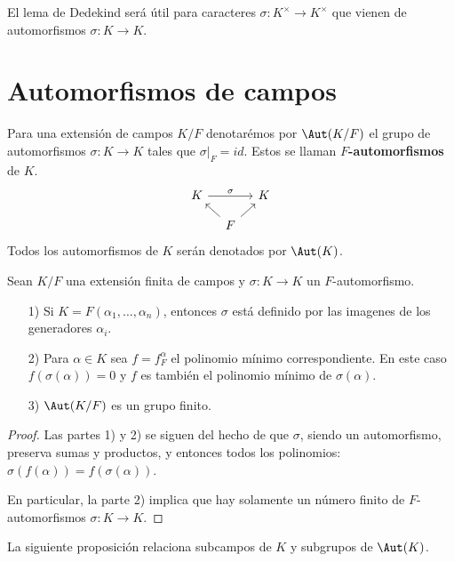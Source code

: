 El lema de Dedekind será útil para caracteres $\sigma\colon K^\times \to K^\times$
que vienen de automorfismos $\sigma\colon K\to K$.


\section{Automorfismos de campos}

Para una extensión de campos $K/F$ denotarémos por $\Aut (K/F)$ el grupo de
automorfismos $\sigma\colon K\to K$ tales que
$\left.\sigma\right|_F = id$. Estos se llaman \textbf{$F$-automorfismos} de $K$.
\[ \begin{tikzcd}[row sep=1em, column sep=1em]
  K \ar{rr}{\sigma} && K \\
   & F\ar{ul}\ar{ur}
\end{tikzcd} \]
Todos los automorfismos de $K$ serán denotados por $\Aut (K)$.

\begin{proposicion}
  Sean $K/F$ una extensión finita de campos y $\sigma\colon K\to K$ un
  $F$-automorfismo.

  \begin{enumerate}
  \item[1)] Si $K = F (\alpha_1,\ldots,\alpha_n)$, entonces $\sigma$ está
    definido por las imagenes de los generadores $\alpha_i$.

  \item[2)] Para $\alpha \in K$ sea $f = f^\alpha_F$ el polinomio mínimo
    correspondiente. En este caso $f (\sigma (\alpha)) = 0$ y $f$ es también
    el polinomio mínimo de $\sigma (\alpha)$.

  \item[3)] $\Aut (K/F)$ es un grupo finito.
  \end{enumerate}

  \begin{proof}
    Las partes 1) y 2) se siguen del hecho de que $\sigma$, siendo un
    automorfismo, preserva sumas y productos, y entonces todos los polinomios:
    $\sigma (f (\alpha)) = f (\sigma (\alpha))$.

    En particular, la parte 2) implica que hay solamente un número finito de
    $F$-automorfismos $\sigma\colon K\to K$.
  \end{proof}
\end{proposicion}

La siguiente proposición relaciona subcampos de $K$ y subgrupos de $\Aut (K)$.

